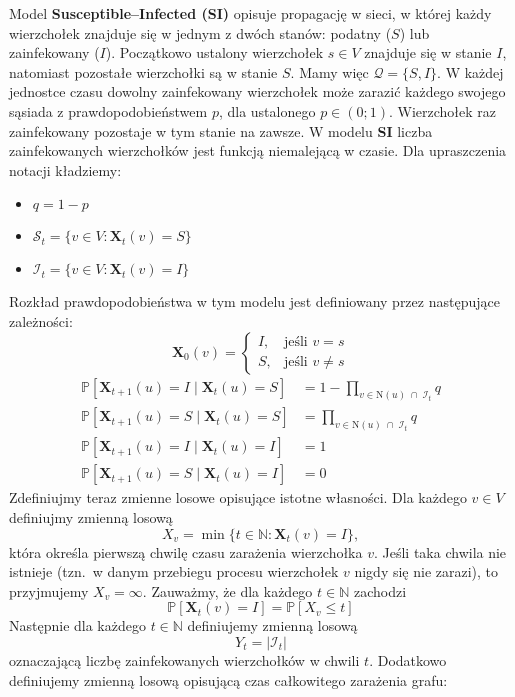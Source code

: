 Model \textbf{Susceptible--Infected (SI)} opisuje propagację w sieci, w której każdy wierzchołek znajduje się w jednym z dwóch stanów: podatny ($S$) lub zainfekowany ($I$).  
Początkowo ustalony wierzchołek $s \in V$ znajduje się w stanie $I$, natomiast pozostałe wierzchołki są w stanie $S$. Mamy więc $\mathcal{Q} = \{S, I\}$.
W każdej jednostce czasu dowolny zainfekowany wierzchołek może zarazić każdego swojego sąsiada z prawdopodobieństwem $p$, dla ustalonego $p \in (0;1)$.  
Wierzchołek raz zainfekowany pozostaje w tym stanie na zawsze.  
W modelu \textbf{SI} liczba zainfekowanych wierzchołków jest funkcją niemalejącą w czasie.
Dla upraszczenia notacji kładziemy: 
\begin{itemize}
    \item $q=1-p$
    \item $\mathcal{S}_t=\{v\in V: \mathbf{X}_t(v) = S\}$
    \item $\mathcal{I}_t=\{v\in V: \mathbf{X}_t(v) = I\}$
\end{itemize}
Rozkład prawdopodobieństwa w tym modelu jest definiowany przez następujące zależności:
\[
\mathbf{X}_0(v) =
\begin{cases}
I, & \text{jeśli } v = s \\[4pt]
S, & \text{jeśli } v \neq s
\end{cases}
\]
\[
\begin{aligned}
\mathbb{P}[\mathbf{X}_{t+1}(u) = I \mid \mathbf{X}_t(u) = S]
 &= 1 - \prod_{v \in \mathrm{N}(u) \;\cap\; \mathcal{I}_t} q \\[6pt]
\mathbb{P}[\mathbf{X}_{t+1}(u) = S \mid \mathbf{X}_t(u) = S]
 &= \prod_{v \in \mathrm{N}(u) \;\cap\; \mathcal{I}_t} q \\[6pt]
\mathbb{P}[\mathbf{X}_{t+1}(u) = I \mid \mathbf{X}_t(u) = I]
 &= 1 \\[6pt]
\mathbb{P}[\mathbf{X}_{t+1}(u) = S \mid \mathbf{X}_t(u) = I]
 &= 0
\end{aligned}
\]
Zdefiniujmy teraz zmienne losowe opisujące istotne własności.
Dla każdego $v \in V$ definiujmy zmienną losową
\[
X_v = \min \{ t \in \mathbb{N} : \mathbf{X}_t(v) = I \},
\]
która określa pierwszą chwilę czasu zarażenia wierzchołka $v$.
Jeśli taka chwila nie istnieje (tzn.\ w danym przebiegu procesu wierzchołek $v$ nigdy się nie zarazi), to przyjmujemy $X_v = \infty$.
Zauważmy, że dla każdego $t \in \mathbb{N}$ zachodzi 
\[
    \mathbb{P}[\mathbf{X}_t(v) = I] = \mathbb{P}[X_v \le t]
\]
Następnie dla każdego $t\in\mathbb{N}$ definiujemy zmienną losową 
\[
    Y_t = |\mathcal{I}_t|
\]
oznaczającą liczbę zainfekowanych wierzchołków w chwili $t$. Dodatkowo definiujemy zmienną losową opisującą czas całkowitego zarażenia grafu:
